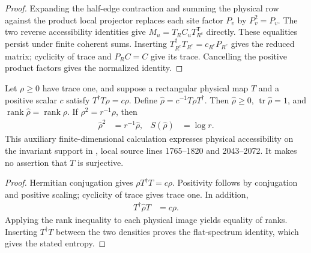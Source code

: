 \begin{proof}\leanok
    Expanding the half-edge contraction and summing the physical row
    against the product local projector replaces each site factor
    $P_v$ by $P_v^2=P_v$. The two reverse accessibility identities give
    $M_u=T_RC_uT_{R^c}^{\mathsf T}$ directly. These equalities persist
    under finite coherent sums. Inserting
    $T_{R^c}^\dagger T_{R^c}=c_{R^c}P_{R^c}$ gives the reduced matrix;
    cyclicity of trace and $P_RC=C$ give its trace. Cancelling the
    positive product factors gives the normalized identity.
\end{proof}

\begin{lemma}%
    \label{thm:peps_supported_physical_density}
    \leanok
    Let $\rho\geq0$ have trace one, and suppose a rectangular physical map
    $T$ and a positive scalar $c$ satisfy $T^\dagger T\rho=c\rho$.
    Define $\widehat\rho=c^{-1}T\rho T^\dagger$. Then
    $\widehat\rho\geq0$, $\operatorname{tr}\widehat\rho=1$, and
    $\operatorname{rank}\widehat\rho=\operatorname{rank}\rho$.
    If $\rho^2=r^{-1}\rho$, then
    \begin{align}
        \widehat\rho^2  & =r^{-1}\widehat\rho, &
        S(\widehat\rho) & =\log r.
    \end{align}
    This auxiliary finite-dimensional calculation expresses physical
    accessibility on the invariant support in
    \cite[Theorem~6.9]{Schuch2010PEPS}, local source lines 1765--1820 and
    2043--2072. It makes no assertion that $T$ is surjective.
\end{lemma}

\begin{proof}\leanok
    Hermitian conjugation gives $\rho T^\dagger T=c\rho$.
    Positivity follows by conjugation and positive scaling; cyclicity of
    trace gives trace one. In addition,
    \begin{align}
        T^\dagger\widehat\rho T & =c\rho.
    \end{align}
    Applying the rank inequality to each physical image yields equality
    of ranks. Inserting $T^\dagger T$ between the two densities proves
    the flat-spectrum identity, which gives the stated entropy.
\end{proof}


